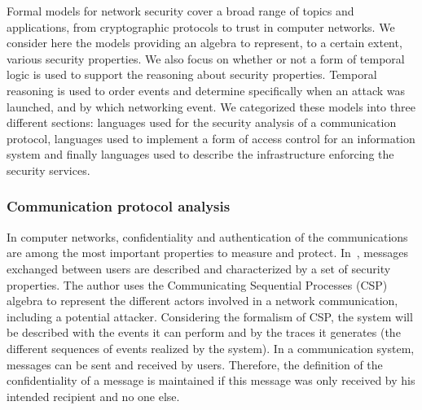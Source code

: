 Formal models for network security cover a broad range of topics and applications, from cryptographic protocols to trust in computer networks.
We consider here the models providing an algebra to represent, to a certain extent, various security properties. 
We also focus on whether or not a form of temporal logic is used to support the reasoning about security properties.
Temporal reasoning is used to order events and determine specifically when an attack was launched, and by which networking event. 
We categorized these models into three different sections: languages used for the security analysis of a communication protocol, languages used to implement a form of access control for an information system and finally languages used to describe the infrastructure enforcing the security services.

\subsubsection{Communication protocol analysis}
In computer networks, confidentiality and authentication of the communications are among the most important properties to measure and protect.
In~\cite{CSP-Schneider1996}, messages exchanged between users are described and characterized by a set of security properties.
The author uses the Communicating Sequential Processes (CSP) algebra to represent the different actors involved in a network communication, including a potential attacker. 
Considering the formalism of CSP, the system will be described with the events it can perform and by the traces it generates (\ie the different sequences of events realized by the system).
In a communication system, messages can be sent and received by users.
Therefore, the definition of the confidentiality of a message is maintained if this message was only received by his intended recipient and no one else.

